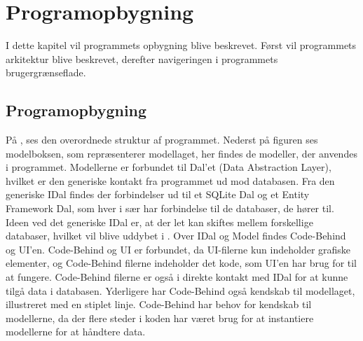 \chapter{Programopbygning}

I dette kapitel vil programmets opbygning blive beskrevet. 
Først vil programmets arkitektur blive beskrevet, derefter navigeringen i programmets brugergrænseflade. 


\section{Programopbygning}\label{sec:programopbygning}



På , ses den overordnede struktur af programmet.
Nederst på figuren ses modelboksen, som repræsenterer modellaget, her findes de modeller, der anvendes i programmet.
Modellerne er forbundet til Dal'et (Data Abstraction Layer), hvilket er den generiske kontakt fra programmet ud mod databasen. 	
Fra den generiske IDal findes der forbindelser ud til et SQLite Dal og et Entity Framework Dal, som hver i sær har forbindelse til de databaser, de hører til. 
Ideen ved det generiske IDal er, at der let kan skiftes mellem forskellige databaser, hvilket vil blive uddybet i .
Over IDal og Model findes Code-Behind og UI'en. 
Code-Behind og UI er forbundet, da UI-filerne kun indeholder grafiske elementer, og Code-Behind filerne indeholder det kode, som UI'en har brug for til at fungere.
Code-Behind filerne er også i direkte kontakt med IDal  for at kunne tilgå data i databasen.
Yderligere har Code-Behind også kendskab til modellaget, illustreret med en stiplet linje.
Code-Behind har behov for kendskab til modellerne, da der flere steder i koden har været brug for at instantiere modellerne for at håndtere data. 

